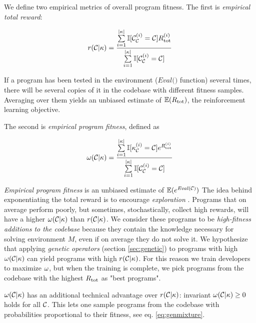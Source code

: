 We define two empirical metrics of overall program fitness.
The first is \emph{empirical total reward}:

\begin{equation}
    r(\mathcal{C}|\kappa) = \frac{\sum\limits_{i=1}^{|\kappa|} \mathbb{I} [\mathcal{C}_{\mathcal{C}}^{(i)}=\mathcal{C}] R_\text{tot}^{(i)}}{\sum\limits_{i=1}^{|\kappa|} \mathbb{I} [\mathcal{C}_{\mathcal{C}}^{(i)}=\mathcal{C}]}
\end{equation}

If a program has been tested in the environment ($\textit{Eval()}$ function) several times, there will be several copies of it in the codebase with different fitness samples.
Averaging over them yields an unbiased estimate of $\mathbb{E}(R_\text{tot})$, the reinforcement learning objective.

The second is \emph{empirical program fitness}, defined as

\begin{equation}
    \omega(\mathcal{C}|\kappa) = \frac{\sum\limits_{i=1}^{|\kappa|} \mathbb{I} [\kappa_{\mathcal{C}}^{(i)}=\mathcal{C}] e^{R_\text{tot}^{(i)}}}{\sum\limits_{i=1}^{|\kappa|} \mathbb{I} [\mathcal{C}_{\mathcal{C}}^{(i)}=\mathcal{C}]}
    \label{eq:empfitness}
\end{equation}

\emph{Empirical program fitness} is an unbiased estimate of $\mathbb{E}(e^{\mathit{Eval}(\mathcal{C})})$
The idea behind exponentiating the total reward is to encourage \emph{exploration} \cite{exploration}.
Programs that on average perform poorly, but sometimes, stochastically, collect high rewards, will have a higher $\omega(\mathcal{C}|\kappa)$ than $r(\mathcal{C}|\kappa)$.
We consider these programs to be \emph{high-fitness additions to the codebase} because they contain the knowledge necessary for solving environment $M$, even if on average they do not solve it.
We hypothesize that applying \emph{genetic operators} (section \ref{sec:genetic}) to programs with high $\omega(\mathcal{C}|\kappa)$ can yield programs with high $r(\mathcal{C}|\kappa)$.
For this reason we train developers to maximize $\omega$, but when the training is complete, we pick programs from the codebase with the highest $R_\text{tot}$ as "best programs".
 
$\omega(\mathcal{C}|\kappa)$ has an additional technical advantage over $r(\mathcal{C}|\kappa)$: invariant $\omega(\mathcal{C}|\kappa) \geq 0$ holds for all $\mathcal{C}$.
This lets one sample programs from the codebase with probabilities proportional to their fitness, see eq. \ref{eq:genmixture}.

